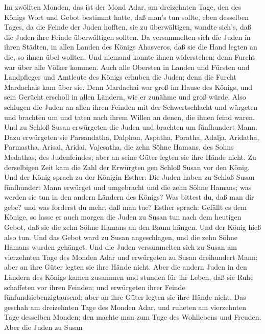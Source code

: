  Im zwölften Monden, das ist der Mond Adar, am dreizehnten
Tage, den des Königs Wort und Gebot bestimmt hatte, daß man's tun
sollte, eben desselben Tages, da die Feinde der Juden hofften, sie zu
überwältigen, wandte sich's, daß die Juden ihre Feinde überwältigen
sollten.  Da versammelten sich die Juden in ihren Städten,
in allen Landen des Königs Ahasveros, daß sie die Hand legten an die, so
ihnen übel wollten. Und niemand konnte ihnen widerstehen; denn Furcht
war über alle Völker kommen.  Auch alle Obersten in Landen
und Fürsten und Landpfleger und Amtleute des Königs erhuben die Juden;
denn die Furcht Mardachais kam über sie.  Denn Mardachai war
groß im Hause des Königs, und sein Gerücht erscholl in allen Ländern,
wie er zunähme und groß würde.  Also schlugen die Juden an
allen ihren Feinden mit der Schwertschlacht und würgeten und brachten um
und taten nach ihrem Willen an denen, die ihnen feind waren.
 Und zu Schloß Susan erwürgeten die Juden und brachten um
fünfhundert Mann.  Dazu erwürgeten sie Parsandatha, Dalphon,
Aspatha,  Poratha, Adalja, Aridatha,  Parmastha,
Arisai, Aridai, Vajesatha,  die zehn Söhne Hamans, des
Sohns Medathas, des Judenfeindes; aber an seine Güter legten sie ihre
Hände nicht.  Zu derselbigen Zeit kam die Zahl der
Erwürgten gen Schloß Susan vor den König.  Und der König
sprach zu der Königin Esther: Die Juden haben zu Schloß Susan
fünfhundert Mann erwürget und umgebracht und die zehn Söhne Hamans; was
werden sie tun in den andern Ländern des Königs? Was bittest du, daß man
dir gebe? und was forderst du mehr, daß man tue?  Esther
sprach: Gefällt es dem Könige, so lasse er auch morgen die Juden zu
Susan tun nach dem heutigen Gebot, daß sie die zehn Söhne Hamans an den
Baum hängen.  Und der König hieß also tun. Und das Gebot
ward zu Susan angeschlagen, und die zehn Söhne Hamans wurden gehänget.
 Und die Juden versammelten sich zu Susan am vierzehnten
Tage des Monden Adar und erwürgeten zu Susan dreihundert Mann; aber an
ihre Güter legten sie ihre Hände nicht.  Aber die andern
Juden in den Ländern des Königs kamen zusammen und stunden für ihr
Leben, daß sie Ruhe schaffeten vor ihren Feinden; und erwürgeten ihrer
Feinde fünfundsiebenzigtausend; aber an ihre Güter legten sie ihre Hände
nicht.  Das geschah am dreizehnten Tage des Monden Adar,
und ruheten am vierzehnten Tage desselben Monden; den machte man zum
Tage des Wohllebens und Freuden.  Aber die Juden zu Susan

